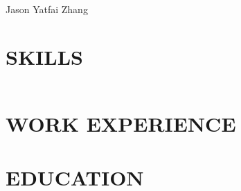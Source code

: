 \documentclass[12pt]{article}
\begin{document}

\begin{center}
\vspace*{10mm}

\Huge{Jason Yatfai Zhang}

\end{center}

\section{SKILLS}
    \begin{center}
    \begin{tabu} to \textwidth { X[l] X[l] }
        
        
    \end{tabu}
    \end{center}

\section{WORK EXPERIENCE}



\section{EDUCATION}
\end{document}
